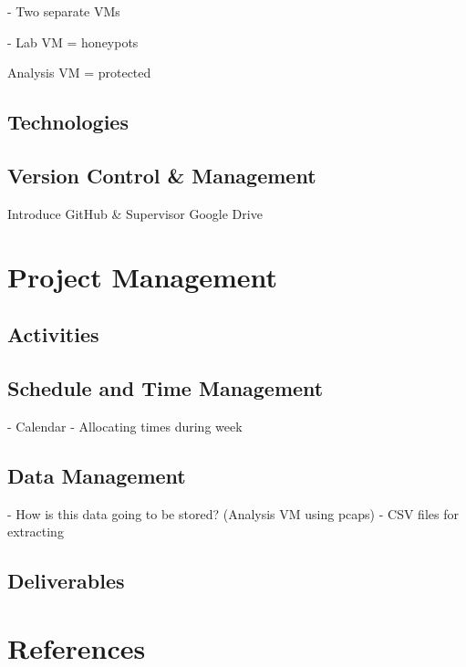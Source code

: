 \documentclass[a4paper,12pt,oneside]{book}			%
\begin{document}
- Two separate VMs

- Lab VM = honeypots

Analysis VM = protected

\section{Technologies}\label{sec:technologies}
\section{Version Control \&{} Management}\label{sec:versionControl}
Introduce GitHub \&{} Supervisor Google Drive


\chapter{Project Management}\label{ch:project management}
\section{Activities}\label{sec:activities}
\section{Schedule and Time Management}\label{sec:time management}
- Calendar
- Allocating times during week
\section{Data Management}\label{sec:data management}
- How is this data going to be stored? (Analysis VM using pcaps)
- CSV files for extracting
\section{Deliverables}\label{sec: deliverables}



\chapter{References}

\printbibliography
\end{document}
